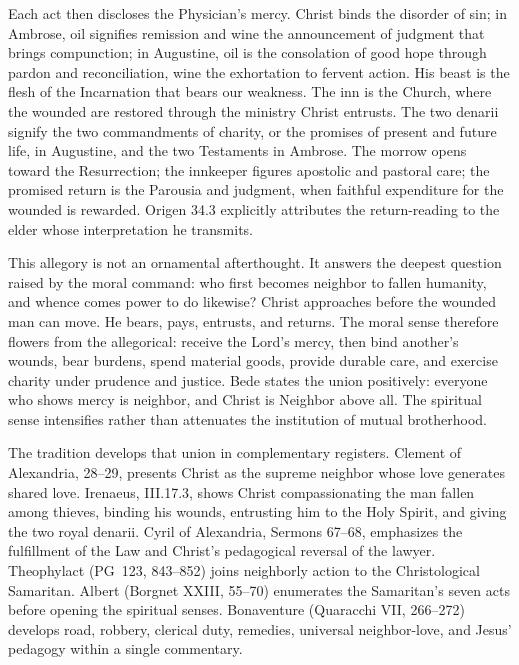Each act then discloses the Physician's mercy. Christ binds the disorder of
sin; in Ambrose, oil signifies remission and wine the announcement of judgment
that brings compunction; in Augustine, oil is the consolation of good hope
through pardon and reconciliation, wine the exhortation to fervent action.
His beast is the flesh of the Incarnation that bears our weakness. The inn is
the Church, where the wounded are restored through the ministry Christ
entrusts. The two denarii signify the two commandments of charity, or the
promises of present and future life, in Augustine, and the two Testaments in
Ambrose. The morrow opens toward the
Resurrection; the innkeeper figures apostolic and pastoral care; the promised
return is the Parousia and judgment, when faithful expenditure for the wounded
is rewarded. Origen 34.3 explicitly attributes the return-reading to the elder
whose interpretation he transmits.

This allegory is not an ornamental afterthought. It answers the deepest
question raised by the moral command: who first becomes neighbor to fallen
humanity, and whence comes power to do likewise? Christ approaches before the
wounded man can move. He bears, pays, entrusts, and returns. The moral sense
therefore flowers from the allegorical: receive the Lord's mercy, then bind
another's wounds, bear burdens, spend material goods, provide durable care,
and exercise charity under prudence and justice. Bede states the union
positively: everyone who shows mercy is neighbor, and Christ is Neighbor above
all. The spiritual sense intensifies rather than attenuates the institution of
mutual brotherhood.

The tradition develops that union in complementary registers. Clement of
Alexandria,  28--29, presents Christ as the supreme
neighbor whose love generates shared love. Irenaeus, 
III.17.3, shows Christ compassionating the man fallen among thieves, binding
his wounds, entrusting him to the Holy Spirit, and giving the two royal
denarii. Cyril of
Alexandria, Sermons 67--68, emphasizes the fulfillment of the Law and Christ's
pedagogical reversal of the lawyer. Theophylact (PG~123, 843--852) joins
neighborly action to the Christological Samaritan. Albert (Borgnet XXIII,
55--70) enumerates the Samaritan's seven acts before opening the spiritual
senses. Bonaventure (Quaracchi VII, 266--272) develops road, robbery, clerical
duty, remedies, universal neighbor-love, and Jesus' pedagogy within a single
commentary.

